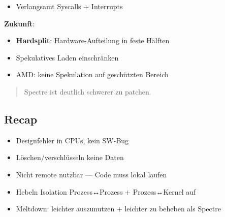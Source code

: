 \documentclass[11pt, a4paper]{article}
\begin{document}
\begin{itemize}
  \item Verlangsamt Syscalls + Interrupts
\end{itemize}

\textbf{Zukunft}:

\begin{itemize}
  \item \textbf{Hardsplit}: Hardware-Aufteilung in feste Hälften
  \item Spekulatives Laden einschränken
  \item AMD: keine Spekulation auf geschützten Bereich
\end{itemize}

\begin{quote}
Spectre ist deutlich schwerer zu patchen.
\end{quote}


\subsection{Recap}
\begin{itemize}
  \item Designfehler in CPUs, kein SW-Bug
  \item Löschen/verschlüsseln keine Daten
  \item Nicht remote nutzbar — Code muss lokal laufen
  \item Hebeln Isolation Prozess↔Prozess + Prozess↔Kernel auf
  \item Meltdown: leichter auszunutzen + leichter zu beheben als Spectre
\end{itemize}




\end{document}

